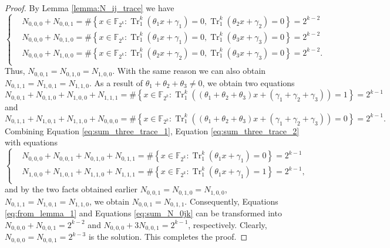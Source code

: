 \documentclass{article}
\newcommand{\F}{\mathbb{F}}
\newcommand{\0}{\textbf{0}}
\newcommand{\1}{\textbf{1}}
\newcommand{\TRACE}{\operatorname{Tr}_1^k}
\theoremstyle{plain}
\begin{document}
    \begin{proof}
        By Lemma \ref{lemma:N_ij_trace} we have
        \begin{equation}\label{eq:from_lemma_1}\left\{\begin{alignedat}{3}
        &N_{0,0,0}+N_{0,0,1}=\#\left\{x\in\F_{2^k} : \TRACE\left(\theta_1x+\gamma_1\right)=0, \TRACE\left(\theta_2x+\gamma_2\right)=0\right\}=2^{k-2}\\
        &N_{0,0,0}+N_{0,1,0}=\#\left\{x\in\F_{2^k} : \TRACE\left(\theta_1x+\gamma_1\right)=0, \TRACE\left(\theta_3x+\gamma_3\right)=0\right\}=2^{k-2}\\
        &N_{0,0,0}+N_{1,0,0}=\#\left\{x\in\F_{2^k} : \TRACE\left(\theta_2x+\gamma_2\right)=0, \TRACE\left(\theta_3x+\gamma_3\right)=0\right\}=2^{k-2}.\\
        \end{alignedat}\right.\end{equation}
        Thus, $N_{0,0,1}=N_{0,1,0}=N_{1,0,0}$. With the same reason we can also obtain  $N_{0,1,1}=N_{1,0,1}=N_{1,1,0}$.
        As a result of $\theta_1+\theta_2+\theta_3\ne 0$, we obtain two equations
        \begin{equation}\label{eq:sum_three_trace_1}
            N_{0,0,1}+N_{0,1,0}+N_{1,0,0}+N_{1,1,1}=\#\left\{x\in\F_{2^k} : \TRACE\left(\left(\theta_1+\theta_2+\theta_3\right)x+\left(\gamma_1+\gamma_2+\gamma_3\right)\right)=1\right\}=2^{k-1}
        \end{equation}
        and
        \begin{equation}\label{eq:sum_three_trace_2}
            N_{0,1,1}+N_{1,0,1}+N_{1,1,0}+N_{0,0,0}=\#\left\{x\in\F_{2^k} : \TRACE\left(\left(\theta_1+\theta_2+\theta_3\right)x+\left(\gamma_1+\gamma_2+\gamma_3\right)\right)=0\right\}=2^{k-1}.
        \end{equation}
        Combining Equation \eqref{eq:sum_three_trace_1}, Equation \eqref{eq:sum_three_trace_2} with equations
        \begin{equation}\label{eq:sum_N_0jk}\left\{\begin{alignedat}{2}
            &N_{0,0,0}+N_{0,0,1}+N_{0,1,0}+N_{0,1,1}=\#\left\{x\in\F_{2^k} : \TRACE\left(\theta_1x+\gamma_1\right)=0\right\}=2^{k-1}\\
            &N_{1,0,0}+N_{1,0,1}+N_{1,1,0}+N_{1,1,1}=\#\left\{x\in\F_{2^k} : \TRACE\left(\theta_1x+\gamma_1\right)=1\right\}=2^{k-1},\\
        \end{alignedat}\right.\end{equation}
        and by the two facts obtained earlier $N_{0,0,1}=N_{0,1,0}=N_{1,0,0}$, $N_{0,1,1}=N_{1,0,1}=N_{1,1,0}$, we obtain $N_{0,0,1}=N_{0,1,1}$.
        Consequently, Equations \eqref{eq:from_lemma_1} and Equations \eqref{eq:sum_N_0jk} can be transformed into
        $N_{0,0,0}+N_{0,0,1}=2^{k-2}$ and $N_{0,0,0}+3N_{0,0,1}=2^{k-1}$, respectively.
        Clearly, $N_{0,0,0}=N_{0,0,1}=2^{k-3}$ is the solution. This completes the proof.
    \end{proof}
\end{document}
